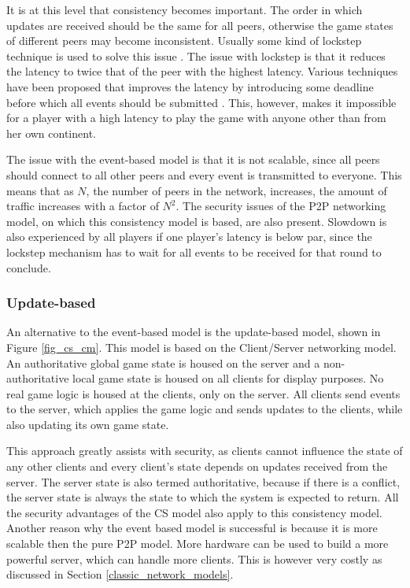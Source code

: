 \documentclass[journal,oneside,a4paper,onecolumn]{IEEEtran}
\begin{document}
It is at this level that consistency becomes important. The order in which updates are received should be the same for all peers, otherwise the game states of different peers may become inconsistent. Usually some kind of lockstep technique is used to solve this issue \cite{pessimistic_lock_step}. The issue with lockstep is that it reduces the latency to twice that of the peer with the highest latency. Various techniques have been proposed that improves the latency by introducing some deadline before which all events should be submitted \cite{cheat_proof_event_ordering}. This, however, makes it impossible for a player with a high latency to play the game with anyone other than from her own continent.

The issue with the event-based model is that it is not scalable, since all peers should connect to all other peers and every event is transmitted to everyone. This means that as $N$, the number of peers in the network, increases, the amount of traffic increases with a factor of $N^2$. The security issues of the P2P networking model, on which this consistency model is based, are also present. Slowdown is also experienced by all players if one player's latency is below par, since the lockstep mechanism has to wait for all events to be received for that round to conclude.

\subsubsection{Update-based}
An alternative to the event-based model is the update-based model, shown in Figure \ref{fig_cs_cm}. This model is based on the Client/Server networking model. An authoritative global game state is housed on the server and a non-authoritative local game state is housed on all clients for display purposes. No real game logic is housed at the clients, only on the server. All clients send events to the server, which applies the game logic and sends updates to the clients, while also updating its own game state.

This approach greatly assists with security, as clients cannot influence the state of any other clients and every client's state depends on updates received from the server. The server state is also termed authoritative, because if there is a conflict, the server state is always the state to which the system is expected to return. All the security advantages of the \ac{CS} model also apply to this consistency model. Another reason why the event based model is successful is because it is more scalable then the pure P2P model. More hardware can be used to build a more powerful server, which can handle more clients. This is however very costly as discussed in Section \ref{classic_network_models}.
\end{document}
